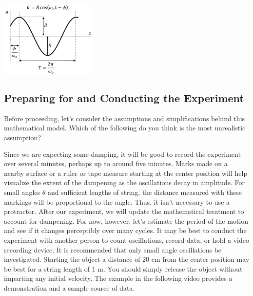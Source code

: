 \documentclass{ximera}
\begin{document}

\begin{image}
 \includegraphics[height=1.5in]{graphofPendulum.jpg}
\end{image}

\subsection*{Preparing for and Conducting the Experiment}

\begin{problem}
Before proceeding, let’s consider the assumptions and simplifications behind this mathematical model.  Which of the following do you think is the most unrealistic assumption?
  \begin{multipleChoice}
    \end{multipleChoice}
\end{problem}

Since we are expecting some damping, it will be good to record the experiment over several minutes, perhaps up to around five minutes.  Marks made on a nearby surface or a ruler or tape measure starting at the center position will help visualize the extent of the dampening as the oscillations decay in amplitude.  For small angles $\theta$ and sufficient lengths of string, the distance measured with these markings will be proportional to the angle.  Thus, it isn't necessary to use a protractor.  After our experiment, we will update the mathematical treatment to account for dampening.  
For now, however, let's estimate the period of the motion and see if it changes perceptibly over many cycles.  It may be best to conduct the experiment with another person to count oscillations, record data, or hold a video recording device.  It is recommended that only small angle oscillations be investigated.  Starting the object a distance of $20$ cm from the center position may be best for a string length of $1$ m.  You should simply release the object without imparting any initial velocity.  
The example in the following video provides a demonstration and a sample source of data.
\end{document}
